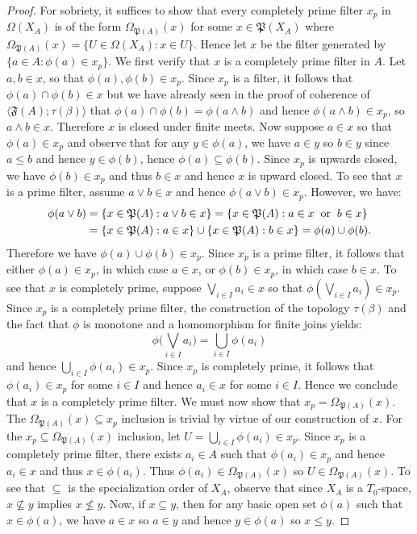 \documentclass{amsart}
\theoremstyle{plain}
\theoremstyle{definition}
\begin{document}
\begin{proof}
    
    For sobriety, it suffices to show that every completely prime filter $x_p$ in $\Omega(X_A)$ is of the form $\Omega_{\mathfrak{P}(A)}(x)$ for some $x\in\mathfrak{P}(X_A)$ where $\Omega_{\mathfrak{P}(A)}(x)=\{U\in\Omega(X_A):x\in U\}$. Hence let $x$ be the filter generated by $\{a\in A:\phi(a)\in x_p\}$. We first verify that $x$ is a completely prime filter in $A$. Let $a,b\in x$, so that $\phi(a),\phi(b)\in x_p$. Since $x_p$ is a filter, it follows that $\phi(a)\cap\phi(b)\in x$ but we have already seen in the proof of coherence of $\langle\mathfrak{F}(A);\tau(\beta)\rangle$ that $\phi(a)\cap\phi(b)=\phi(a\wedge b)$ and hence $\phi(a\wedge b)\in x_p$, so $a\wedge b\in x$. Therefore $x$ is closed under finite meets. Now suppose $a\in x$ so that $\phi(a)\in x_p$ and observe that for any $y\in \phi(a)$, we have $a\in y$ so $b\in y$ since $a\leq b$ and hence $y\in\phi(b)$, hence $\phi(a)\subseteq\phi(b)$. Since $x_p$ is upwards closed, we have $\phi(b)\in x_p$ and thus $b\in x$ and hence $x$ is upward closed. To see that $x$ is a prime filter, assume $a\vee b\in x$ and hence $\phi(a\vee b)\in x_p$. However, we have: 
\begin{align*}
    \phi(a\vee b)&=\{x\in\mathfrak{P}(A):a\vee b\in x\}
    =\{x\in\mathfrak{P}(A):a\in x\hspace{.2cm}\text{or}\hspace{.2cm}b\in x\}
    \\&=\{x\in\mathfrak{P}(A):a\in x\}\cup\{x\in\mathfrak{P}(A):b\in x\}=\phi(a)\cup\phi(b).
\end{align*}
Therefore we have $\phi(a)\cup\phi(b)\in x_p$. Since $x_p$ is a prime filter, it follows that either $\phi(a)\in x_p$, in which case $a\in x$, or $\phi(b)\in x_p$, in which case $b\in x$. To see that $x$ is completely prime, suppose $\bigvee_{i\in I}a_i\in x$ so that $\phi(\bigvee_{i\in I}a_i)\in x_p$. Since $x_p$ is a completely prime filter, the construction of the topology $\tau(\beta)$ and the fact that $\phi$ is monotone and a homomorphism for finite joins yields: 
\[\phi\Biggl(\bigvee_{i\in I}a_i\Biggl)=\bigcup_{i\in I}\phi(a_i)\] and hence $\bigcup_{i\in I}\phi(a_i)\in x_p$. Since $x_p$ is completely prime, it follows that $\phi(a_i)\in x_p$ for some $i\in I$ and hence $a_i\in x$ for some $i\in I$. Hence we conclude that $x$ is a completely prime filter. We must now show that $x_p=\Omega_{\mathfrak{P}(A)}(x)$. The $\Omega_{\mathfrak{P}(A)}(x)\subseteq x_p$ inclusion is trivial by virtue of our construction of $x$. For the $x_p\subseteq\Omega_{\mathfrak{P}(A)}(x)$ inclusion, let $U=\bigcup_{i\in I}\phi(a_i)\in x_p$. Since $x_p$ is a completely prime filter, there exists $a_i\in A$ such that $\phi(a_i)\in x_p$ and hence $a_i\in x$ and thus $x\in\phi(a_i)$. Thus $\phi(a_i)\in\Omega_{\mathfrak{P}(A)}(x)$ so $U\in \Omega_{\mathfrak{P}(A)}(x)$. To see that $\subseteq$ is the specialization order of $X_A$, observe that since $X_A$ is a $T_0$-space, $x\not\subseteq y$ implies $x\not\leqslant y$. Now, if $x\subseteq y$, then for any basic open set $\phi(a)$ such that $x\in\phi(a)$, we have $a\in x$ so $a\in y$ and hence $y\in\phi(a)$ so $x\leqslant y$.   
\end{proof}
\end{document}
